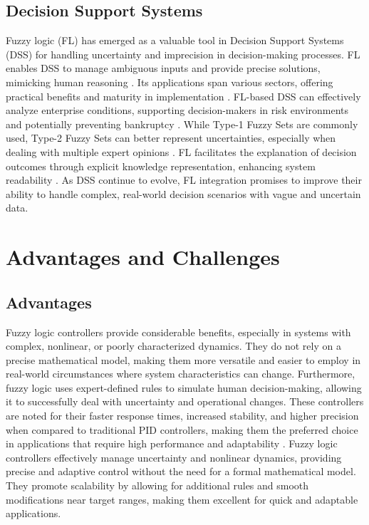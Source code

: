 \documentclass[a4paper,12pt]{report}
\begin{document}
\section{Decision Support Systems}
Fuzzy logic (FL) has emerged as a valuable tool in Decision Support Systems (DSS) for handling uncertainty and imprecision in decision-making processes. FL enables DSS to manage ambiguous inputs and provide precise solutions, mimicking human reasoning . Its applications span various sectors, offering practical benefits and maturity in implementation \cite{metaxiotis2004new}. FL-based DSS can effectively analyze enterprise conditions, supporting decision-makers in risk environments and potentially preventing bankruptcy \cite{tishkina2018application}. While Type-1 Fuzzy Sets are commonly used, Type-2 Fuzzy Sets can better represent uncertainties, especially when dealing with multiple expert opinions \cite{comas2014type}. FL facilitates the explanation of decision outcomes through explicit knowledge representation, enhancing system readability . As DSS continue to evolve, FL integration promises to improve their ability to handle complex, real-world decision scenarios with vague and uncertain data.

\chapter{Advantages and Challenges}
\section{Advantages}
Fuzzy logic controllers provide considerable benefits, especially in systems with complex, nonlinear, or poorly characterized dynamics. They do not rely on a precise mathematical model, making them more versatile and easier to employ in real-world circumstances where system characteristics can change. Furthermore, fuzzy logic uses expert-defined rules to simulate human decision-making, allowing it to successfully deal with uncertainty and operational changes. These controllers are noted for their faster response times, increased stability, and higher precision when compared to traditional PID controllers, making them the preferred choice in applications that require high performance and adaptability \cite{diouf2021comparative}.
Fuzzy logic controllers effectively manage uncertainty and nonlinear dynamics, providing precise and adaptive control without the need for a formal mathematical model. They promote scalability by allowing for additional rules and smooth modifications near target ranges, making them excellent for quick and adaptable applications\cite{ashbaughadvantages}.
\end{document}
